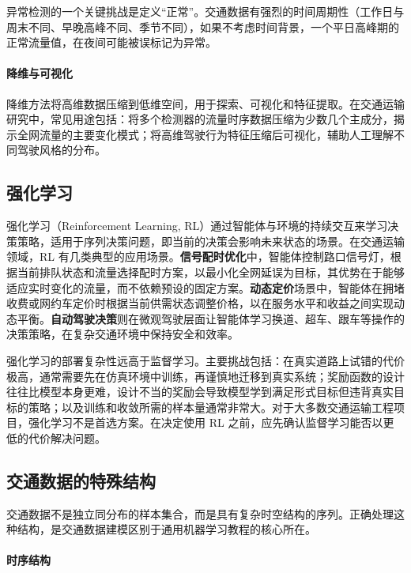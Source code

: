 异常检测的一个关键挑战是定义“正常”。交通数据有强烈的时间周期性（工作日与周末不同、早晚高峰不同、季节不同），如果不考虑时间背景，一个平日高峰期的正常流量值，在夜间可能被误标记为异常。

\paragraph{降维与可视化}

降维方法将高维数据压缩到低维空间，用于探索、可视化和特征提取。在交通运输研究中，常见用途包括：将多个检测器的流量时序数据压缩为少数几个主成分，揭示全网流量的主要变化模式；将高维驾驶行为特征压缩后可视化，辅助人工理解不同驾驶风格的分布。

\subsection{强化学习}

强化学习（Reinforcement Learning, RL）通过智能体与环境的持续交互来学习决策策略，适用于序列决策问题，即当前的决策会影响未来状态的场景。在交通运输领域，RL 有几类典型的应用场景。\textbf{信号配时优化}中，智能体控制路口信号灯，根据当前排队状态和流量选择配时方案，以最小化全网延误为目标，其优势在于能够适应实时变化的流量，而不依赖预设的固定方案。\textbf{动态定价}场景中，智能体在拥堵收费或网约车定价时根据当前供需状态调整价格，以在服务水平和收益之间实现动态平衡。\textbf{自动驾驶决策}则在微观驾驶层面让智能体学习换道、超车、跟车等操作的决策策略，在复杂交通环境中保持安全和效率。

强化学习的部署复杂性远高于监督学习。主要挑战包括：在真实道路上试错的代价极高，通常需要先在仿真环境中训练，再谨慎地迁移到真实系统；奖励函数的设计往往比模型本身更难，设计不当的奖励会导致模型学到满足形式目标但违背真实目标的策略；以及训练和收敛所需的样本量通常非常大。对于大多数交通运输工程项目，强化学习不是首选方案。在决定使用 RL 之前，应先确认监督学习能否以更低的代价解决问题。

\subsection{交通数据的特殊结构}

交通数据不是独立同分布的样本集合，而是具有复杂时空结构的序列。正确处理这种结构，是交通数据建模区别于通用机器学习教程的核心所在。

\paragraph{时序结构}

